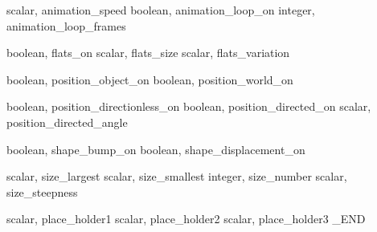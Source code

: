 scalar,  animation_speed
boolean, animation_loop_on
integer, animation_loop_frames

boolean, flats_on
scalar,  flats_size
scalar,  flats_variation

boolean, position_object_on
boolean, position_world_on

boolean, position_directionless_on
boolean, position_directed_on
scalar,  position_directed_angle

boolean, shape_bump_on
boolean, shape_displacement_on

scalar,  size_largest
scalar,  size_smallest
integer, size_number
scalar,  size_steepness

scalar,  place_holder1
scalar,  place_holder2
scalar,  place_holder3
_END
